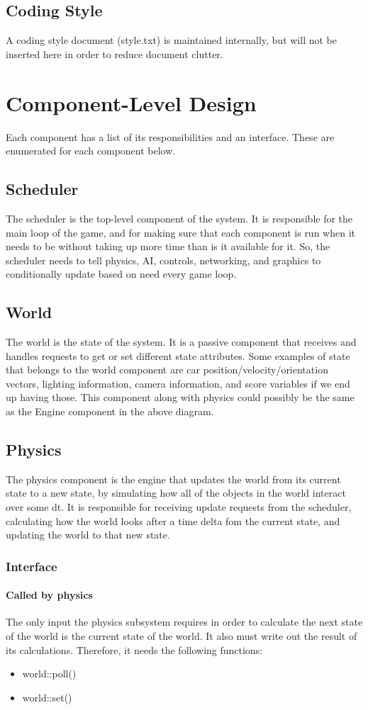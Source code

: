 \documentclass[12pt]{article}
\begin{document}
\subsection{Coding Style} A coding style document (style.txt) is maintained internally, but will not be inserted here in order to reduce document clutter.

\section{Component-Level Design}
Each component has a list of its responsibilities and an interface. These are
enumerated for each component below.
\subsection{Scheduler}
The scheduler is the top-level component of the system. It is responsible for
the main loop of the game, and for making sure that each component is run
when it needs to be without taking up more time than is it available for it.
So, the scheduler needs to tell physics, AI, controls, networking, and graphics
to conditionally update based on need every game loop.
\subsection{World}
The world is the state of the system. It is a passive component that receives
and handles requests to get or set different state attributes. Some examples
of state that belongs to the world component are car
position/velocity/orientation vectors, lighting information, camera information,
and score variables if we end up having those. This component along with physics
could possibly be the same as the Engine component in the above diagram.
\subsection{Physics}
The physics component is the engine that updates the world from its current
state to a new state, by simulating how all of the objects in the world
interact over some dt. It is responsible for receiving update requests from the
scheduler, calculating how the world looks after a time delta fom the current
state, and updating the world to that new state.
\subsubsection{Interface}
\paragraph{Called by physics}
The only input the physics subsystem requires in order to calculate the next
state of the world is the current state of the world. It also must write out
the result of its calculations. Therefore, it needs the following functions:
\begin{itemize}
\item world::poll()
\item world::set()
\end{itemize}
\end{document}
